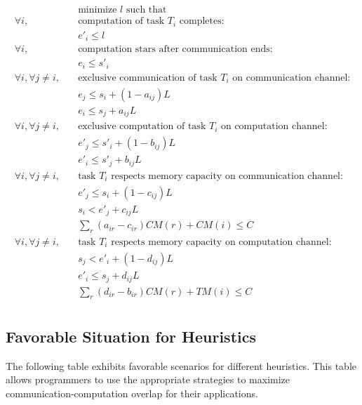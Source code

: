 \documentclass[runningheads]{llncs} %
\begin{document}
\vspace*{-0.5cm}
\begin{align*}
& \text{minimize } l \text{ such that }\\
\forall i, \quad & \text{computation of task } T_i \text{ completes:}\\
& e'_i \leq l\\
\forall i, \quad & \text{computation stars after communication ends:}\\
& e_i \leq s'_i\\
\forall i, \forall j\ne i, \quad & \text{exclusive communication of task }T_i \text{ on communication channel:}\\
& e_j \leq s_i +(1-a_{ij})L\\
& e_i\leq s_j +a_{ij}L\\
\forall i, \forall j\ne i, \quad & \text{exclusive computation of task }T_i \text{ on computation channel:}\\
& e'_j \leq s'_i +(1-b_{ij})L\\
& e'_i\leq s'_j +b_{ij}L\\
\forall i, \forall j\ne i, \quad & \text{task }T_i \text{ respects memory capacity on communication channel:}\\
& e'_j \leq s_i +(1-c_{ij})L\\
& s_i< e'_j +c_{ij}L\\
& \sum_r (a_{ir} - c_{ir})CM(r) + CM(i) \le C\\
\forall i, \forall j\ne i, \quad & \text{task }T_i \text{ respects memory capacity on computation channel:}\\
& s_j < e'_i +(1-d_{ij})L\\
& e'_i\leq s_j +d_{ij}L\\
& \sum_r (d_{ir} - b_{ir})CM(r) + TM(i) \le C\\
\end{align*} 

\subsection{Favorable Situation for Heuristics}
\noindent The following table exhibits favorable scenarios for different heuristics. This table allows programmers to use the appropriate strategies to maximize communication-computation overlap for their applications.
\end{document}
